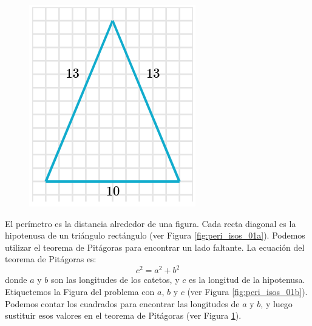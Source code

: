 \begin{solutionbox}{14cm}
\begin{minipage}{0.4\textwidth}
\begin{multicols}{2}
\begin{figure}[H]
                \caption{}
                \label{fig:peri_isos_01c}
            \end{figure}%
            \begin{figure}[H]
                \centering
                \includegraphics[width=0.9\linewidth]{../images/peri_isos_01d.png}
                \caption{}
                \label{fig:peri_isos_01d}
            \end{figure}
        \end{multicols}
    \end{minipage}\hfill
    \begin{minipage}{0.55\textwidth}
        El perímetro es la distancia alrededor de una figura.
        Cada recta diagonal es la hipotenusa de un triángulo rectángulo (ver Figura \ref{fig:peri_isos_01a}).
        Podemos utilizar el teorema de Pitágoras para encontrar un lado faltante.
        La ecuación del teorema de Pitágoras es:
        \[c^2=a^2+b^2\]
        donde $a$ y $b$ son las longitudes de los catetos, y $c$ es la longitud de la hipotenusa.
        Etiquetemos la Figura del problema con $a$, $b$ y $c$ (ver Figura \ref{fig:peri_isos_01b}).
        Podemos contar los cuadrados para encontrar las longitudes de $a$ y $b$, y luego sustituir esos valores en el teorema de Pitágoras (ver Figura \ref{fig:peri_isos_01c}).

\end{minipage}
\end{solutionbox}
